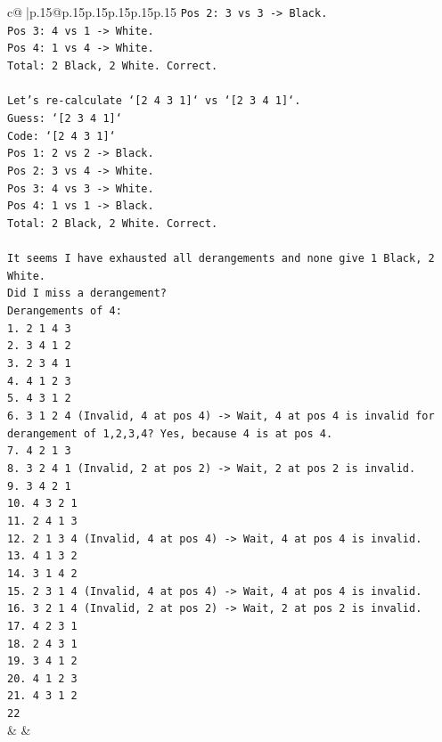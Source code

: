\documentclass{article}
\begin{document}
{\begin{supertabular}{c@{$\;$}|p{.15\linewidth}@{}p{.15\linewidth}p{.15\linewidth}p{.15\linewidth}p{.15\linewidth}p{.15\linewidth}}
{{{\texttt{Pos 2: 3 vs 3 {-}> Black.} \\
\texttt{Pos 3: 4 vs 1 {-}> White.} \\
\texttt{Pos 4: 1 vs 4 {-}> White.} \\
\texttt{Total: 2 Black, 2 White. Correct.} \\
\\ 
\texttt{Let's re{-}calculate `{[}2 4 3 1{]}` vs `{[}2 3 4 1{]}`.} \\
\texttt{Guess: `{[}2 3 4 1{]}`} \\
\texttt{Code: `{[}2 4 3 1{]}`} \\
\texttt{Pos 1: 2 vs 2 {-}> Black.} \\
\texttt{Pos 2: 3 vs 4 {-}> White.} \\
\texttt{Pos 3: 4 vs 3 {-}> White.} \\
\texttt{Pos 4: 1 vs 1 {-}> Black.} \\
\texttt{Total: 2 Black, 2 White. Correct.} \\
\\ 
\texttt{It seems I have exhausted all derangements and none give 1 Black, 2 White.} \\
\texttt{Did I miss a derangement?} \\
\texttt{Derangements of 4:} \\
\texttt{1. 2 1 4 3} \\
\texttt{2. 3 4 1 2} \\
\texttt{3. 2 3 4 1} \\
\texttt{4. 4 1 2 3} \\
\texttt{5. 4 3 1 2} \\
\texttt{6. 3 1 2 4 (Invalid, 4 at pos 4) {-}> Wait, 4 at pos 4 is invalid for derangement of 1,2,3,4? Yes, because 4 is at pos 4.} \\
\texttt{7. 4 2 1 3} \\
\texttt{8. 3 2 4 1 (Invalid, 2 at pos 2) {-}> Wait, 2 at pos 2 is invalid.} \\
\texttt{9. 3 4 2 1} \\
\texttt{10. 4 3 2 1} \\
\texttt{11. 2 4 1 3} \\
\texttt{12. 2 1 3 4 (Invalid, 4 at pos 4) {-}> Wait, 4 at pos 4 is invalid.} \\
\texttt{13. 4 1 3 2} \\
\texttt{14. 3 1 4 2} \\
\texttt{15. 2 3 1 4 (Invalid, 4 at pos 4) {-}> Wait, 4 at pos 4 is invalid.} \\
\texttt{16. 3 2 1 4 (Invalid, 2 at pos 2) {-}> Wait, 2 at pos 2 is invalid.} \\
\texttt{17. 4 2 3 1} \\
\texttt{18. 2 4 3 1} \\
\texttt{19. 3 4 1 2} \\
\texttt{20. 4 1 2 3} \\
\texttt{21. 4 3 1 2} \\
\texttt{22} \\
            }
        }
    }
    & & \\ \\


\end{supertabular}}
\end{document}
